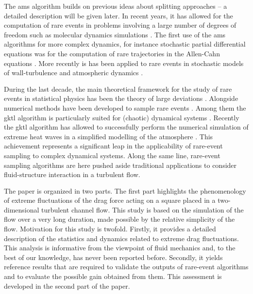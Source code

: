 \documentclass[pre,aps,floatfix,10pt,superscriptaddress, notitlepage,preprint]{revtex4-1}
\begin{document}
The \acl{ams} algorithm \cite{cerou_adaptive_2007} builds on previous ideas about splitting approaches \cite{KahnHarris1951,glasserman_look_1998,glasserman_multilevel_1999} -- a detailed description will be given later.  
In recent years, it has allowed for the computation of rare events in problems involving a large number of degrees of freedom such as molecular dynamics simulations \cite{aristoff_adaptive_2015,teo_adaptive_2016}. The first use of the \ac{ams} algorithms for more complex dynamics, for instance stochastic partial differential equations was for the computation of rare trajectories in the Allen-Cahn equations \cite{rolland_computing_2016}. More recently is has been applied to rare events in stochastic models of wall-turbulence \cite{rolland_extremely_2018} and atmospheric dynamics \cite{bouchet2019rare}.

During the last decade, the main theoretical framework for the study of rare events in statistical physics has been the theory of large deviations \cite{touchette_large_2009}.
Alongside numerical methods have been developed to sample rare events \cite{moral_feynman-kac_2004}. 
Among them the \ac{gktl} algorithm \cite{giardina_direct_2006} is particularly suited for (chaotic) dynamical systems \cite{giardina_simulating_2011,Laffargue_2013}.
%
{Recently the \ac{gktl} algorithm has allowed to successfully perform the numerical simulation of extreme heat waves in a simplified modelling of the atmosphere \cite{ragone_computation_2018}. 
This achievement represents a significant leap in the applicability of rare-event sampling to complex dynamical systems. Along the same line, rare-event sampling algorithms are here pushed aside traditional applications to consider fluid-structure interaction in a turbulent flow.}
%

{The paper is organized in two parts. The first part highlights the phenomenology of extreme fluctuations of the drag force acting on a square placed in a two-dimensional turbulent channel flow. This study is based on the simulation of the flow over a very long duration, made possible by the relative simplicity of the flow.}
%
Motivation for this study is twofold.
Firstly, it provides a detailed description of the statistics and dynamics related to extreme drag fluctuations. This analysis is informative from the  viewpoint of fluid mechanics and, to the best of our knowledge, has never been reported before.
Secondly, it yields reference results that are required to validate the outputs of rare-event algorithms and to evaluate the possible gain obtained from them. This assessment is developed in the second part of the paper.
\end{document}
